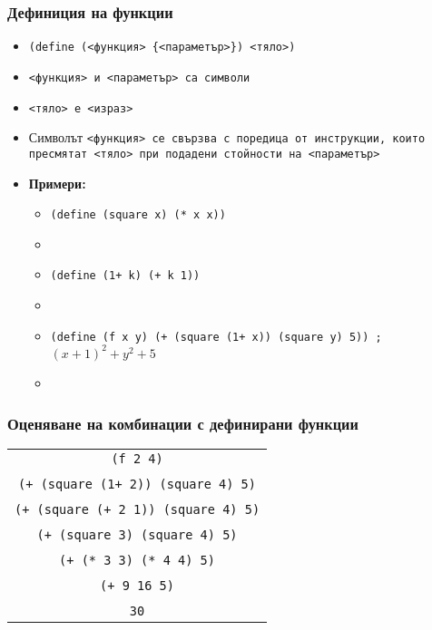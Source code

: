 \documentclass{beamer}
\begin{document}
\begin{frame}
  \frametitle{Дефиниция на функции}

  \begin{itemize}[<+->]
  \item \tt{\alert{(define (}{}<функция> \{<параметър>\}\alert{)} <тяло>\alert{)}}
  \item \tt{<функция>} и \tt{<параметър>} са символи
  \item \tt{<тяло>} е \tt{<израз>}
  \item Символът \tt{<функция>} се свързва с поредица от инструкции, които пресмятат \tt{<тяло>} при подадени стойности на \tt{<параметър>}
  \item \textbf{Примери:}
    \begin{itemize}
    \item \tt{(define (square x) (* x x))}
    \item {}
    \item \tt{(define (1+ k) (+ k 1))}
    \item {}
    \item \tt{(define (f x y) (+ (square (1+ x)) (square y) 5)) ;} $(x+1)^2 + y^2 + 5$
    \item {}
    \end{itemize}
  \end{itemize}
\end{frame}

\begin{frame}
  \frametitle{Оценяване на комбинации с дефинирани функции}
  \begin{center}
    \begin{tabular}{c}
      \tt{(f 2 4)}\\
      \pause\nxt{\bda\\
      \tt{(+ (square (1+ 2)) (square 4) 5)}\\
      \nxt{\bda\\
      \tt{(+ (square (+ 2 1)) (square 4) 5)}\\
      \nxt{\bda\\
      \tt{(+ (square 3) (square 4) 5)}\\
      \nxt{\bda\\
      \tt{(+ (* 3 3) (* 4 4) 5)}\\
      \nxt{\bda\\
      \tt{(+ 9 16 5)}\\
      \nxt{\bda\\
      \tt{30}}}}}}}
    \end{tabular}
  \end{center}
\end{frame}
\end{document}
